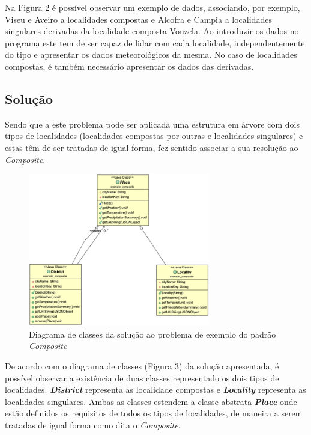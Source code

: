 \documentclass[10pt,portuguese]{article}
\begin{document}
\par Na Figura 2 é possível observar um exemplo de dados, associando, por exemplo, Viseu e Aveiro a localidades compostas e Alcofra e Campia a localidades singulares derivadas da localidade composta Vouzela. Ao introduzir os dados no programa este tem de ser capaz de lidar com cada localidade, independentemente do tipo e apresentar os dados meteorológicos da mesma. No caso de localidades compostas, é também necessário apresentar os dados das derivadas.

\clearpage

\subsection{Solução}

\par Sendo que a este problema pode ser aplicada uma estrutura em árvore com dois tipos de localidades (localidades compostas por outras e localidades singulares) e estas têm de ser tratadas de igual forma, fez sentido associar a sua resolução ao \textit{Composite}.

\begin{figure}[!h]
    \centering
    \includegraphics[width=300]{images/composite/UML_Example.png}
    \caption{Diagrama de classes da solução ao problema de exemplo do padrão \textit{Composite}}
\end{figure}

\par De acordo com o diagrama de classes (Figura 3) da solução apresentada, é possível observar a existência de duas classes representado os dois tipos de localidades. \textbf{\textit{District}} representa as localidade compostas e \textbf{\textit{Locality}} representa as localidades singulares. Ambas as classes estendem a classe abstrata \textbf{\textit{Place}} onde estão definidos os requisitos de todos os tipos de localidades, de maneira a serem tratadas de igual forma como dita o \textit{Composite}.
\end{document}
